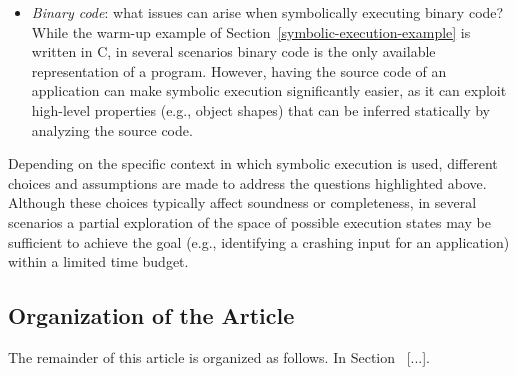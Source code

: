 \begin{itemize}
  \item {\em Binary code}: what issues can arise when symbolically executing binary code?
 While the warm-up example of Section~\ref{symbolic-execution-example} is written in C, in several scenarios binary code is the only available representation of a program. However, having the source code of an application can make symbolic execution significantly easier, as it can exploit high-level properties (e.g., object shapes) that can be inferred statically by analyzing the source code.
   
\end{itemize}
Depending on the specific context in which symbolic execution is used, different choices and assumptions are made to address the questions highlighted above. Although these choices typically affect soundness or completeness, in several scenarios a partial exploration of the space of possible execution states may be sufficient to achieve the goal (e.g., identifying a crashing input for an application) within a limited time budget.


\subsection{Organization of the Article}

The remainder of this article is organized as follows. In Section \missing\ [...].

